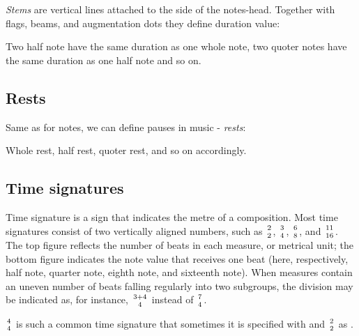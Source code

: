 \textit{Stems} are vertical lines attached to the side of the notes-head. Together with flags, beams, and augmentation
dots they define duration value:

\figcenter{}

Two half note have the same duration as one whole note, two quoter notes have the same duration as one half note and so
on.


\subsection{Rests}\label{subsec:rests}
Same as for notes, we can define pauses in music - \textit{rests}:

\figcenter{}

Whole rest, half rest, quoter rest, and so on accordingly.

\subsection{Time signatures}\label{subsec:time-signatures}
Time signature is a sign that indicates the metre of a composition. Most time signatures consist of two vertically
aligned numbers, such as $2\atop2$, $3\atop4$, $6\atop8$, and $11\atop16$. The top figure reflects the number of beats
in each measure, or metrical unit; the bottom figure indicates the note value that receives one beat (here,
respectively, half note, quarter note, eighth note, and sixteenth note). When measures contain an uneven number of
beats falling regularly into two subgroups, the division may be indicated as, for instance, ${3+4}\atop4$ instead
of $7\atop4$\cite{time-signature}.

\figcenter{}

$4\atop4$ is such a common time signature that sometimes it is specified with  and $2\atop2$ as .
